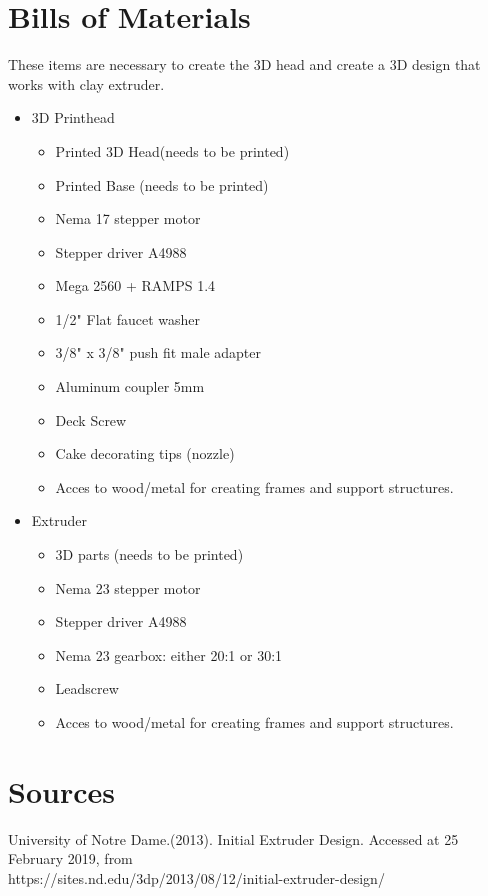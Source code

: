 \documentclass[11pt]{article}
\begin{document}
\newpage

\section{Bills of Materials}

These items are necessary to create the 3D head and create a 3D design that works with clay  extruder.  

\begin{itemize}
	\item 3D Printhead
	\begin{itemize}
		\item Printed 3D Head(needs to be printed)
		\item Printed Base (needs to be printed)
		\item Nema 17 stepper motor 
		\item Stepper driver A4988
		\item Mega 2560 + RAMPS 1.4
		\item 1/2" Flat faucet washer
		\item 3/8" x 3/8" push fit male adapter
		\item Aluminum coupler 5mm
		\item Deck Screw	
		\item Cake decorating tips (nozzle)
		\item Acces to wood/metal for creating frames and support structures. 
	\end{itemize}
	\item Extruder
	\begin{itemize}
		\item 3D parts (needs to be printed)
		\item Nema 23 stepper motor 
		\item Stepper driver A4988
		\item Nema 23 gearbox: either 20:1 or 30:1
		\item Leadscrew
		\item Acces to wood/metal for creating frames and support structures. 		
	\end{itemize}	
\end{itemize}

	
	
\newpage
    
   
\section{Sources}
	

		University of Notre Dame.(2013). Initial Extruder Design. Accessed at 25 February 2019, from \\
	https://sites.nd.edu/3dp/2013/08/12/initial-extruder-design/\\
	
\end{document}
